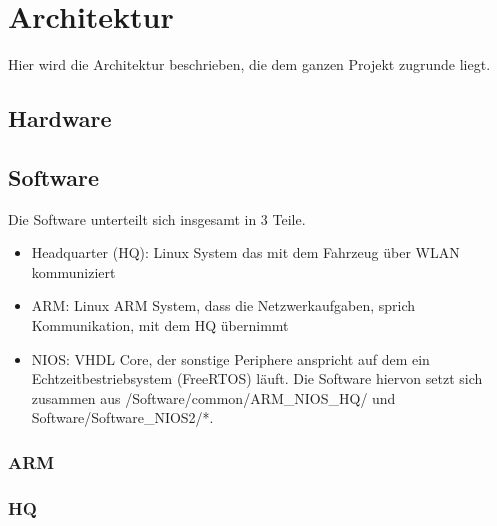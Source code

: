 \chapter{Architektur}
Hier wird die Architektur beschrieben, die dem ganzen Projekt zugrunde liegt.
\section{Hardware}

\section{Software}
Die Software unterteilt sich insgesamt in 3 Teile.
\begin{itemize}
 \item Headquarter (HQ): Linux System das mit dem Fahrzeug über WLAN kommuniziert
 \item ARM: Linux ARM System, dass die Netzwerkaufgaben, sprich Kommunikation, mit dem HQ übernimmt
 \item NIOS: VHDL Core, der sonstige Periphere anspricht auf dem ein Echtzeitbestriebsystem (FreeRTOS) läuft. Die Software hiervon setzt sich zusammen aus /Software/common/ARM\_NIOS\_HQ/ und Software/Software\_NIOS2/*.
\end{itemize}

\subsection{ARM}


\subsection{HQ}
